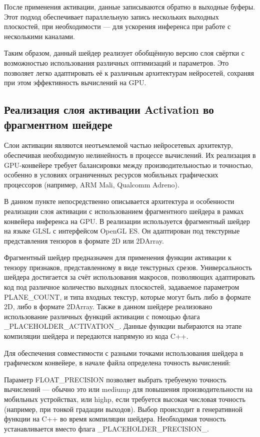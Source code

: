 \documentclass[a4paper,14pt]{extreport}
\begin{document}
            После применения активации, данные записываются обратно в выходные буферы. Этот подход обеспечивает параллельную запись нескольких выходных плоскостей, при необходимости — для ускорения инференса при работе с несколькими каналами.
            
            
            Таким образом, данный шейдер реализует обобщённую версию слоя свёртки с возможностью использования различных оптимизаций и параметров. Это позволяет легко адаптировать её к различным архитектурам нейросетей, сохраняя при этом эффективность вычислений на GPU.
        
        \subsection{Реализация слоя активации Activation во фрагментном шейдере}
            Слои активации являются неотъемлемой частью нейросетевых архитектур, обеспечивая необходимую нелинейность в процессе вычислений. Их реализация в GPU-конвейере требует балансировки между производительностью и точностью, особенно в условиях ограниченных ресурсов мобильных графических процессоров (например, ARM Mali, Qualcomm Adreno).
            
            В данном пункте непосредственно описывается архитектура и особенности реализации слоя активации с использованием фрагментного шейдера в рамках конвейера инференса на GPU. В реализации используется фрагментный шейдер на языке GLSL с интерфейсом OpenGL ES. Он адаптирован под текстурные представления тензоров в формате 2D или 2DArray.
            
            Фрагментный шейдер предназначен для применения функции активации к тензору признаков, представленному в виде текстурных срезов. Универсальность шейдера достигается за счёт использования макросов, позволяющих адаптировать код под различное количество выходных плоскостей, задаваемое параметром PLANE\_COUNT, и типа входных текстур, которые могут быть либо в формате 2D, либо в формате 2DArray. Также в данном шейдере реализовано использование различных функций активации с помощью флага \_PLACEHOLDER\_ACTIVATION\_. Данные функции выбираются на этапе компиляции шейдера и передаются напрямую из кода C++.
            
            Для обеспечения совместимости с разными точками использования шейдера в графическом конвейере, в начале файла определена точность вычислений:
            
            Параметр FLOAT\_PRECISION позволяет выбрать требуемую точность вычислений — обычно это или mediump для повышения производительности на мобильных устройствах, или highp, если требуется высокая числовая точность (например, при тонкой градации выходов). Выбор происходит в генеративной функции на C++ во время компиляции шейдера. Необходимая точность устанавливается вместо флага \_PLACEHOLDER\_PRECISION\_.
            
\end{document}
